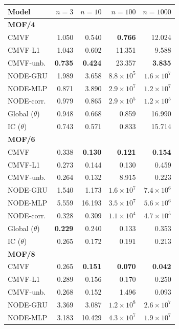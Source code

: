 \begin{tabular*}{\linewidth}{@{\extracolsep{\fill}}lrrrr}
\toprule
Model & $n=3$ & $n=10$ & $n=100$ & $n=1000$ \\
\midrule
\multicolumn{5}{l}{\textbf{MOF/4}} \\
CMVF & 1.050 & 0.540 & \textbf{0.766} & 12.024 \\
CMVF-L1 & 1.043 & 0.602 & 11.351 & 9.588 \\
CMVF-unb. & \textbf{0.735} & \textbf{0.424} & 23.357 & \textbf{3.835} \\
NODE-GRU & 1.989 & 3.658 & $8.8\!\times\!10^{5}$ & $1.6\!\times\!10^{7}$ \\
NODE-MLP & 0.871 & 3.890 & $2.9\!\times\!10^{7}$ & $1.2\!\times\!10^{7}$ \\
NODE-corr. & 0.979 & 0.865 & $2.9\!\times\!10^{5}$ & $1.2\!\times\!10^{5}$ \\
Global ($\theta$) & 0.948 & 0.668 & 0.859 & 16.990 \\
IC ($\theta$) & 0.743 & 0.571 & 0.833 & 15.714 \\
\midrule
\multicolumn{5}{l}{\textbf{MOF/6}} \\
CMVF & 0.338 & \textbf{0.130} & \textbf{0.121} & \textbf{0.154} \\
CMVF-L1 & 0.273 & 0.144 & 0.130 & 0.459 \\
CMVF-unb. & 0.264 & 0.132 & 8.915 & 0.223 \\
NODE-GRU & 1.540 & 1.173 & $1.6\!\times\!10^{7}$ & $7.4\!\times\!10^{6}$ \\
NODE-MLP & 5.559 & 16.193 & $3.5\!\times\!10^{7}$ & $5.6\!\times\!10^{6}$ \\
NODE-corr. & 0.328 & 0.309 & $1.1\!\times\!10^{4}$ & $4.7\!\times\!10^{5}$ \\
Global ($\theta$) & \textbf{0.229} & 0.240 & 0.133 & 0.353 \\
IC ($\theta$) & 0.265 & 0.172 & 0.191 & 0.213 \\
\midrule
\multicolumn{5}{l}{\textbf{MOF/8}} \\
CMVF & 0.265 & \textbf{0.151} & \textbf{0.070} & \textbf{0.042} \\
CMVF-L1 & 0.289 & 0.156 & 0.170 & 0.250 \\
CMVF-unb. & 0.268 & 0.152 & 1.496 & 0.093 \\
NODE-GRU & 3.369 & 3.087 & $1.2\!\times\!10^{8}$ & $2.6\!\times\!10^{7}$ \\
NODE-MLP & 3.183 & 10.429 & $4.3\!\times\!10^{7}$ & $1.9\!\times\!10^{7}$ \\

\end{tabular*}

